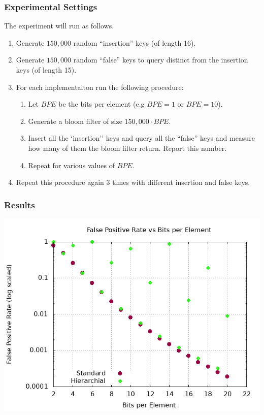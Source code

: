 \subsubsection{Experimental Settings}

The experiment will run as follows. 
\begin{enumerate}
\item Generate $150,000$ random ``insertion'' keys (of length 16).
\item Generate $150,000$ random ``false'' keys to query distinct from the insertion keys (of length 15).
\item For each implementaiton run the following procedure:
\begin{enumerate}
    \item Let $BPE$ be the bits per element (e.g $BPE = 1$ or $BPE = 10$).
    \item Generate a bloom filter of size $150,000\cdot BPE$.
    \item Insert all the `insertion'' keys and query all the ``false'' keys and measure how many of them the bloom filter return. Report this number.
    \item Repeat for various values of $BPE$.
\end{enumerate}
\item Repeat this procedure again $3$ times with different insertion and false keys.
\end{enumerate}

\subsubsection{Results}
\begin{center}
    \includegraphics[width=14cm]{plots/fp.png}
\end{center}


